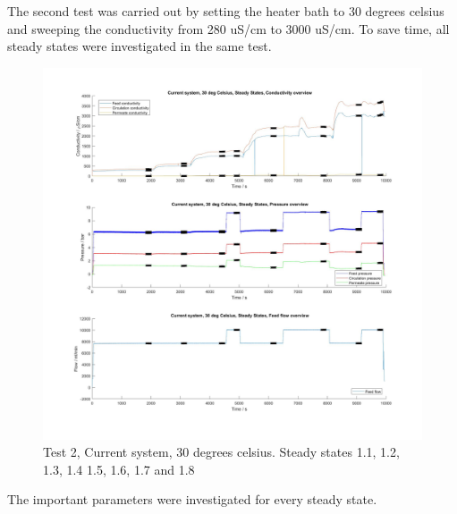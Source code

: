 \newpage
The second test was carried out by setting the heater bath to 30 degrees celsius and sweeping the conductivity from 280 uS/cm to 3000 uS/cm. To save time, all steady states were investigated in the same test.  

\begin{figure}[H]
    \centering
    \includegraphics[width=1.1\textwidth]{overview30}
    \caption{Test 2, Current system, 30 degrees celsius. Steady states 1.1, 1.2, 1.3, 1.4 1.5, 1.6, 1.7 and 1.8}
    \label{fig:PressConn}
\end{figure}

\newpage

The important parameters were investigated for every steady state.

